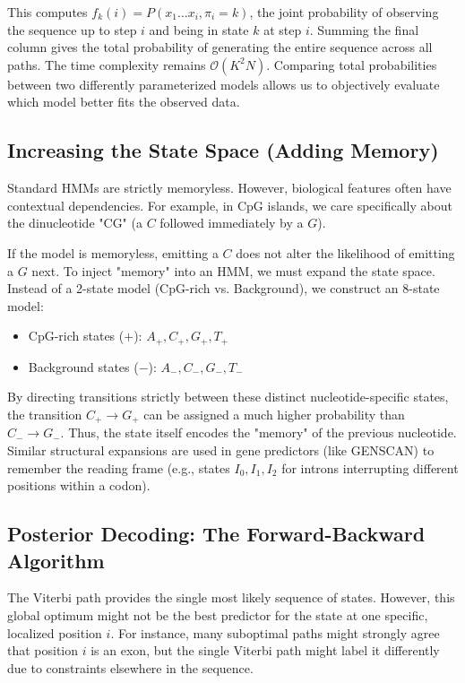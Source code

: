 This computes $f_k(i) = P(x_1 \dots x_i, \pi_i=k)$, the joint probability of observing the sequence up to step $i$ and being in state $k$ at step $i$. Summing the final column gives the total probability of generating the entire sequence across all paths. The time complexity remains $\mathcal{O}(K^2N)$.
Comparing total probabilities between two differently parameterized models allows us to objectively evaluate which model better fits the observed data.

\subsection{Increasing the State Space (Adding Memory)}

Standard HMMs are strictly memoryless. However, biological features often have contextual dependencies. For example, in CpG islands, we care specifically about the dinucleotide "CG" (a $C$ followed immediately by a $G$).

If the model is memoryless, emitting a $C$ does not alter the likelihood of emitting a $G$ next. To inject "memory" into an HMM, we must expand the state space. Instead of a 2-state model (CpG-rich vs. Background), we construct an 8-state model:
\begin{itemize}
    \item CpG-rich states ($+$): $A_+, C_+, G_+, T_+$
    \item Background states ($-$): $A_-, C_-, G_-, T_-$
\end{itemize}
By directing transitions strictly between these distinct nucleotide-specific states, the transition $C_+ \rightarrow G_+$ can be assigned a much higher probability than $C_- \rightarrow G_-$. Thus, the state itself encodes the "memory" of the previous nucleotide. Similar structural expansions are used in gene predictors (like GENSCAN) to remember the reading frame (e.g., states $I_0, I_1, I_2$ for introns interrupting different positions within a codon).

\subsection{Posterior Decoding: The Forward-Backward Algorithm}

The Viterbi path provides the single most likely sequence of states. However, this global optimum might not be the best predictor for the state at one specific, localized position $i$. For instance, many suboptimal paths might strongly agree that position $i$ is an exon, but the single Viterbi path might label it differently due to constraints elsewhere in the sequence.

